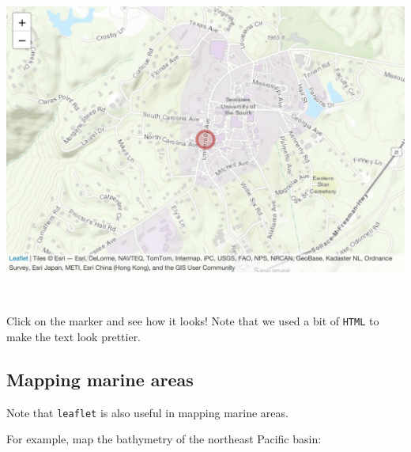 \documentclass[
]{book}
\newenvironment{Shaded}{\begin{snugshade}}{\end{snugshade}}
\newcommand{\AttributeTok}[1]{\textcolor[rgb]{0.77,0.63,0.00}{#1}}
\newcommand{\DecValTok}[1]{\textcolor[rgb]{0.00,0.00,0.81}{#1}}
\newcommand{\FunctionTok}[1]{\textcolor[rgb]{0.00,0.00,0.00}{#1}}
\newcommand{\NormalTok}[1]{#1}
\newcommand{\SpecialCharTok}[1]{\textcolor[rgb]{0.00,0.00,0.00}{#1}}
\begin{document}
\includegraphics[width=694.08px]{figures/unnamed-chunk-226-1}

~

Click on the marker and see how it looks! Note that we used a bit of \texttt{HTML} to make the text look prettier.

\hypertarget{mapping-marine-areas}{%
\subsection*{Mapping marine areas}\label{mapping-marine-areas}}

Note that \texttt{leaflet} is also useful in mapping marine areas.

For example, map the bathymetry of the northeast Pacific basin:

\begin{Shaded}
\end{Shaded}
\end{document}
